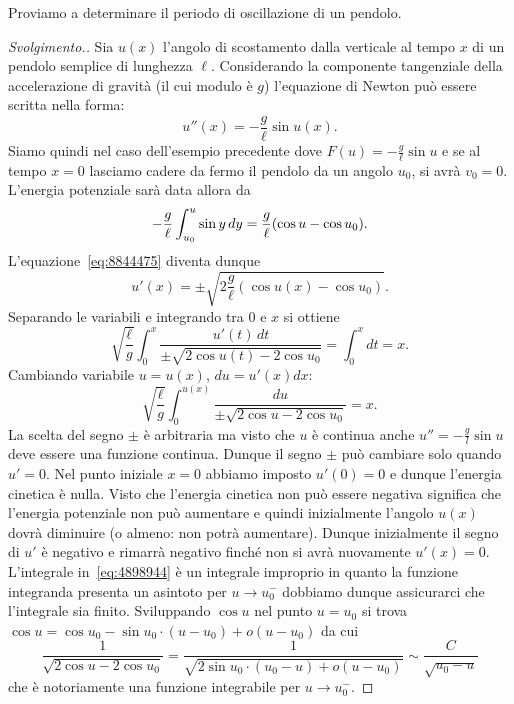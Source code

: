 \begin{example}
%
%
%
%
Proviamo a determinare il periodo di oscillazione di un pendolo.
\end{example}
\begin{proof}[Svolgimento.]
Sia $u(x)$
l'angolo di scostamento dalla verticale
al tempo $x$ di un pendolo semplice di lunghezza $\ell$.
Considerando la componente tangenziale della accelerazione di gravità
(il cui modulo è $g$)
l'equazione di Newton può essere scritta nella forma:
\[
  u''(x) = -\frac{g}{\ell} \sin u(x).
\]
Siamo quindi nel caso dell'esempio precedente dove $F(u) = -\frac{g}{\ell} \sin u$
e se al tempo $x=0$ lasciamo cadere da fermo il pendolo da un angolo $u_0$,
si avrà $v_0=0$. L'energia potenziale sarà data allora da
\[
-\frac{g}{\ell}\int_{u_0}^u \sin y\, dy = \frac{g}{\ell}{\left( \cos u - \cos u_0 \right)}.
\]
L'equazione~\eqref{eq:8844475} diventa dunque
\[
  u'(x) = \pm \sqrt{2\frac{g}{\ell}(\cos u(x) - \cos u_0)}.
\]
Separando le variabili e integrando tra $0$ e $x$ si ottiene
\[
\sqrt{\frac \ell g}\int_0^x \frac{u'(t)\, dt}{\pm\sqrt{2\cos u(t)-2\cos u_0}}
= \int_0^x dt  = x.
\]
Cambiando variabile $u=u(x)$, $du = u'(x) dx$:
\begin{equation}\label{eq:4898944}
\sqrt{\frac \ell g}\int_0^{u(x)} \frac{du}{\pm\sqrt{2\cos u-2\cos u_0}} = x.
\end{equation}
La scelta del segno $\pm$ è arbitraria ma visto che $u$ è continua
anche $u''=-\frac g l \sin u$ deve essere una funzione continua. Dunque il segno
$\pm$ può cambiare solo quando $u'=0$. Nel punto iniziale $x=0$ abbiamo
imposto $u'(0) = 0$ e dunque l'energia cinetica è nulla. Visto che l'energia
cinetica non può essere negativa significa che l'energia potenziale
non può aumentare e quindi inizialmente l'angolo $u(x)$ dovrà diminuire
(o almeno: non potrà aumentare). Dunque inizialmente il segno di $u'$ è negativo
e rimarrà negativo finché non si avrà nuovamente $u'(x)=0$.
L'integrale in~\eqref{eq:4898944} è un integrale improprio in quanto
la funzione integranda presenta un asintoto per $u\to u_0^-$ dobbiamo dunque
assicurarci che l'integrale sia finito. Sviluppando $\cos u$ nel punto $u=u_0$
si trova $\cos u = \cos u_0  - \sin u_0 \cdot (u-u_0) + o(u-u_0)$ da cui
\[
 \frac{1}{\sqrt{2 \cos u - 2 \cos u_0}}
 =\frac{1}{\sqrt{2\sin u_0\cdot (u_0-u) + o(u-u_0)}}
 \sim \frac{C}{\sqrt{u_0-u}}
\]
che è notoriamente una funzione integrabile per $u\to u_0^-$.


\end{proof}
